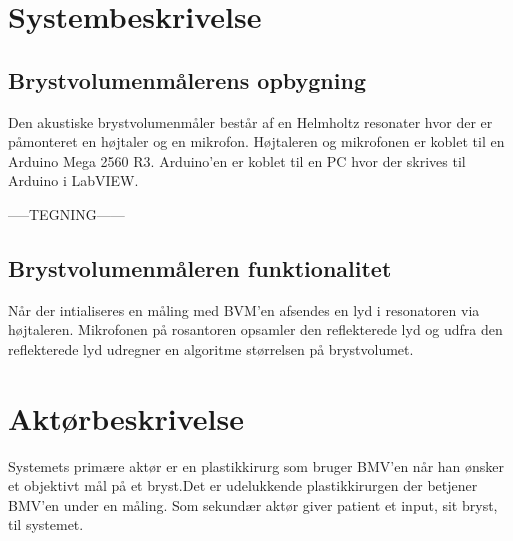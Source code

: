 \documentclass[10pt,a4paper]{report}
\begin{document}
\section*{Systembeskrivelse}

\subsection*{Brystvolumenmålerens opbygning}
Den akustiske brystvolumenmåler består af en Helmholtz resonater hvor der er påmonteret en højtaler og en mikrofon. Højtaleren og mikrofonen er koblet til en Arduino Mega 2560 R3. Arduino'en er koblet til en PC hvor der skrives til Arduino i LabVIEW. 

-----TEGNING------

\subsection*{Brystvolumenmåleren funktionalitet}

Når der intialiseres en måling med BVM'en afsendes en lyd i resonatoren via højtaleren. Mikrofonen på rosantoren opsamler den reflekterede lyd og udfra den reflekterede lyd udregner en algoritme størrelsen på brystvolumet. 

\section*{Aktørbeskrivelse}

Systemets primære aktør er en plastikkirurg som bruger BMV'en når han ønsker et objektivt mål på et bryst.Det er udelukkende plastikkirurgen der  betjener BMV'en under en måling. Som sekundær aktør giver patient et input, sit bryst, til systemet. 
 
\end{document}
